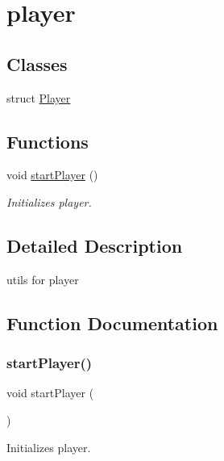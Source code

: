 \hypertarget{group__player}{}\section{player}
\label{group__player}
\subsection*{Classes}
\begin{DoxyCompactItemize}
\item 
struct \mbox{\hyperlink{struct_player}{Player}}
\end{DoxyCompactItemize}
\subsection*{Functions}
\begin{DoxyCompactItemize}
\item 
void \mbox{\hyperlink{group__player_gaee94db5fedae28c554588232013a5536}{start\+Player}} ()
\begin{DoxyCompactList}\small\item\em Initializes player. \end{DoxyCompactList}\end{DoxyCompactItemize}


\subsection{Detailed Description}
utils for player 

\subsection{Function Documentation}
\mbox{\label{group__player_gaee94db5fedae28c554588232013a5536}} 
\subsubsection{\texorpdfstring{startPlayer()}{startPlayer()}}
{\footnotesize\ttfamily void start\+Player (\begin{DoxyParamCaption}{ }\end{DoxyParamCaption})}



Initializes player. 

